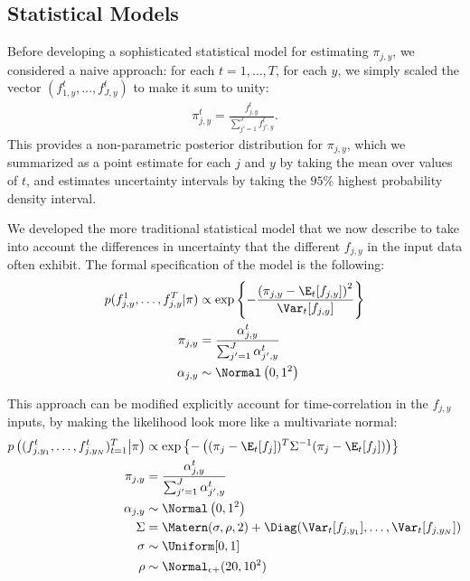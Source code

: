  \subsection*{Statistical Models}
  Before developing a sophisticated statistical model for estimating
  $\pi_{j,y}$, we considered a naive approach: for each
  $t=1,\ldots,T$, for each $y$, we simply scaled the vector
  $(f_{1,y}^t, \ldots, f_{J,y}^t)$ to make it sum to unity:
  \begin{align*}
    \pi_{j,y}^t = \frac{f_{j,y}^t}{\sum_{j'=1}^J f_{j',y}^t}.
  \end{align*}
  This provides a non-parametric posterior distribution for
  $\pi_{j,y}$, which we summarized as a point estimate for each $j$
  and $y$ by taking the mean over values of $t$, and estimates
  uncertainty intervals by taking the $95\%$ highest probability
  density interval.

  We developed the more traditional statistical model that we now
  describe to take into account the differences in uncertainty that
  the different $f_{j,y}$ in the input data often exhibit.  The formal
  specification of the model is the following:
  \begin{align*}
    p(f_{j,y}^1,\ldots,f_{j,y}^T | \pi) &\propto \exp\left\{-\frac{\left(\pi_{j,y}-\E_t[f_{j,y}]\right)^2}{\Var_t[f_{j,y}]} \right\}\\
    \pi_{j,y} &= \frac{\alpha_{j,y}^t}{\sum_{j'=1}^J \alpha_{j',y}^t}\\
    \alpha_{j,y} &\sim \Normal\left(0, 1^2\right)
  \end{align*}

 This approach can be modified explicitly account for time-correlation in the
 $f_{j,y}$ inputs, by making the likelihood look more like a
 multivariate normal:
  \begin{align*}
    p\left((f_{j,y_1}^t,\ldots,f_{j,y_N}^t)_{t=1}^T \big| \pi \right)
    &\propto \exp\left\{-\left((\pi_j - \E_t[f_j])^T \Sigma^{-1} (\pi_j - \E_t[f_j])\right) \right\}\\
    \pi_{j,y} &= \frac{\alpha_{j,y}^t}{\sum_{j'=1}^J \alpha_{j',y}^t}\\
    \alpha_{j,y} &\sim \Normal\left(0, 1^2\right)\\
    \Sigma &= \Matern(\sigma, \rho, 2) + \Diag(\Var_t[f_{j,y_1}],
      \ldots, \Var_t[f_{j,y_N}])\\
    \sigma &\sim \Uniform[0,1]\\
    \rho &\sim \Normal_{\epsilon+}(20, 10^2)
  \end{align*}


